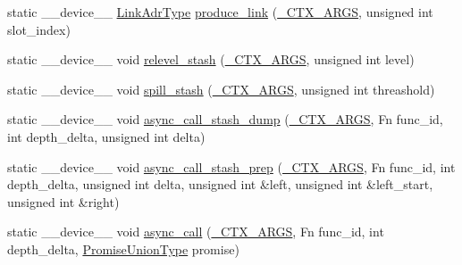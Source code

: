 \begin{DoxyCompactItemize}
\item 
static \-\_\-\-\_\-device\-\_\-\-\_\- \hyperlink{structHarmonizeProgram_3_01PromiseUnion_3_01FN__IDS_8_8_8_4_00	PROGRAM__STATE_00	ADR__TYPE_00	ST96305cc1a177b714bc64a5044f46c97c_a4d8821dc6e61a340560067db6a3c6d09}{Link\-Adr\-Type} \hyperlink{structHarmonizeProgram_3_01PromiseUnion_3_01FN__IDS_8_8_8_4_00	PROGRAM__STATE_00	ADR__TYPE_00	ST96305cc1a177b714bc64a5044f46c97c_ae2cea73f616b977849598509dcdad20c}{produce\-\_\-link} (\hyperlink{harmonize_8cpp_af53c5ff5aaad0ae06e6d57824cf1611f}{\-\_\-\-C\-T\-X\-\_\-\-A\-R\-G\-S}, unsigned int slot\-\_\-index)
\item 
static \-\_\-\-\_\-device\-\_\-\-\_\- void \hyperlink{structHarmonizeProgram_3_01PromiseUnion_3_01FN__IDS_8_8_8_4_00	PROGRAM__STATE_00	ADR__TYPE_00	ST96305cc1a177b714bc64a5044f46c97c_a0c2c10dd8bace9ee8c1a54aacbd0c03c}{relevel\-\_\-stash} (\hyperlink{harmonize_8cpp_af53c5ff5aaad0ae06e6d57824cf1611f}{\-\_\-\-C\-T\-X\-\_\-\-A\-R\-G\-S}, unsigned int level)
\item 
static \-\_\-\-\_\-device\-\_\-\-\_\- void \hyperlink{structHarmonizeProgram_3_01PromiseUnion_3_01FN__IDS_8_8_8_4_00	PROGRAM__STATE_00	ADR__TYPE_00	ST96305cc1a177b714bc64a5044f46c97c_af73aa9a5c6ca208c23cc01c7bd71da66}{spill\-\_\-stash} (\hyperlink{harmonize_8cpp_af53c5ff5aaad0ae06e6d57824cf1611f}{\-\_\-\-C\-T\-X\-\_\-\-A\-R\-G\-S}, unsigned int threashold)
\item 
static \-\_\-\-\_\-device\-\_\-\-\_\- void \hyperlink{structHarmonizeProgram_3_01PromiseUnion_3_01FN__IDS_8_8_8_4_00	PROGRAM__STATE_00	ADR__TYPE_00	ST96305cc1a177b714bc64a5044f46c97c_ac1bbcaccc1cc537c8083eaf153fd70a7}{async\-\_\-call\-\_\-stash\-\_\-dump} (\hyperlink{harmonize_8cpp_af53c5ff5aaad0ae06e6d57824cf1611f}{\-\_\-\-C\-T\-X\-\_\-\-A\-R\-G\-S}, Fn func\-\_\-id, int depth\-\_\-delta, unsigned int delta)
\item 
static \-\_\-\-\_\-device\-\_\-\-\_\- void \hyperlink{structHarmonizeProgram_3_01PromiseUnion_3_01FN__IDS_8_8_8_4_00	PROGRAM__STATE_00	ADR__TYPE_00	ST96305cc1a177b714bc64a5044f46c97c_a61906b1c4021a5d9fa8d20f9be53e33b}{async\-\_\-call\-\_\-stash\-\_\-prep} (\hyperlink{harmonize_8cpp_af53c5ff5aaad0ae06e6d57824cf1611f}{\-\_\-\-C\-T\-X\-\_\-\-A\-R\-G\-S}, Fn func\-\_\-id, int depth\-\_\-delta, unsigned int delta, unsigned int \&left, unsigned int \&left\-\_\-start, unsigned int \&right)
\item 
static \-\_\-\-\_\-device\-\_\-\-\_\- void \hyperlink{structHarmonizeProgram_3_01PromiseUnion_3_01FN__IDS_8_8_8_4_00	PROGRAM__STATE_00	ADR__TYPE_00	ST96305cc1a177b714bc64a5044f46c97c_af7ee0c39e06ac3d29d6fb8666be626e5}{async\-\_\-call} (\hyperlink{harmonize_8cpp_af53c5ff5aaad0ae06e6d57824cf1611f}{\-\_\-\-C\-T\-X\-\_\-\-A\-R\-G\-S}, Fn func\-\_\-id, int depth\-\_\-delta, \hyperlink{structHarmonizeProgram_3_01PromiseUnion_3_01FN__IDS_8_8_8_4_00	PROGRAM__STATE_00	ADR__TYPE_00	ST96305cc1a177b714bc64a5044f46c97c_a9ed971681cf35354ed9a935b1e05bb23}{Promise\-Union\-Type} promise)

\end{DoxyCompactItemize}
